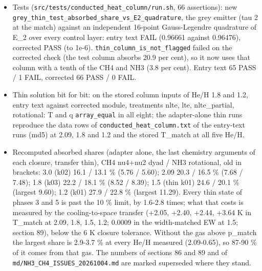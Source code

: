 \documentclass[english,a4paper]{my_memo}
\providecommand{\tightlist}{\setlength{\itemsep}{0pt}\setlength{\parskip}{0pt}}
\begin{document}
\begin{itemize}
\tightlist
\item
  Tests (\texttt{src/tests/conducted\_heat\_column/run.sh}, 66 assertions): new
  \texttt{grey\_thin\_test\_absorbed\_share\_vs\_E2\_quadrature}, the grey emitter (tau 2
  at the match) against an independent 16-point Gauss-Legendre quadrature of
  E\_2 over every control layer: entry text FAIL (0.96661 against 0.96476),
  corrected PASS (to 1e-6). \texttt{thin\_column\_is\_not\_flagged} failed on the
  corrected check (the test column absorbs 20.9 per cent), so it now uses
  that column with a tenth of the CH4 and NH3 (3.8 per cent). Entry text 65
  PASS / 1 FAIL, corrected 66 PASS / 0 FAIL.
\item
  Thin solution bit for bit: on the stored column inputs of He/H 1.8 and
  1.2, entry text against corrected module, treatments nlte, lte,
  nlte\_partial, rotational: T and q \texttt{array\_equal} in all eight; the
  adapter-alone thin runs reproduce the data rows of
  \texttt{conducted\_heat\_column.txt} of the entry-text runs (md5) at 2.09, 1.8 and
  1.2 and the stored T\_match at all five He/H.
\item
  Recomputed absorbed shares (adapter alone, the last chemistry arguments
  of each closure, transfer thin), CH4 nu4+nu2 dyad / NH3 rotational, old in
  brackets: 3.0 (k02) 16.1 / 13.1 \% (5.76 / 5.60); 2.09 20.3 / 16.5 \% (7.68
  / 7.48); 1.8 (k03) 22.2 / 18.1 \% (8.52 / 8.39); 1.5 (thin k01) 24.6 /
  20.1 \% (largest 9.60); 1.2 (k01) 27.9 / 22.8 \% (largest 11.29). Every
  thin state of phases 3 and 5 is past the 10 \% limit, by 1.6-2.8 times;
  what that costs is measured by the cooling-to-space transfer (+2.05,
  +2.40, +2.44, +3.64 K in T\_match at 2.09, 1.8, 1.5, 1.2; 0.0009 in the
  width-matched EW at 1.5; section 89), below the 6 K closure tolerance.
  Without the gas above p\_match the largest share is 2.9-3.7 \% at every
  He/H measured (2.09-0.65), so 87-90 \% of it comes from that gas.
  The numbers of sections 86 and 89 and of \texttt{md/NH3\_CH4\_ISSUES\_20261004.md}
  are marked superseded where they stand.
\end{itemize}
\end{document}
